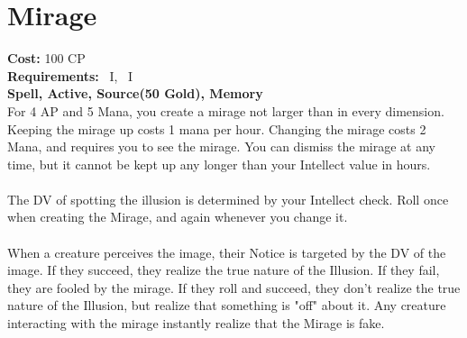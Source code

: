 \section{Mirage}\label{spell:mirage}
\textbf{Cost:} 100 CP\\
\textbf{Requirements:}~ I,~ I\\
\textbf{Spell, Active, Source(50 Gold), Memory}\\
For 4 AP and 5 Mana, you create a mirage not larger than  in every dimension.
Keeping the mirage up costs 1 mana per hour.
Changing the mirage costs 2 Mana, and requires you to see the mirage.
You can dismiss the mirage at any time, but it cannot be kept up any longer than your Intellect value in hours.\\
\\
The DV of spotting the illusion is determined by your Intellect check.
Roll once when creating the Mirage, and again whenever you change it. \\
\\
When a creature perceives the image, their Notice is targeted by the DV of the image.
If they succeed, they realize the true nature of the Illusion.
If they fail, they are fooled by the mirage.
If they roll and succeed, they don't realize the true nature of the Illusion, but realize that something is "off" about it.
Any creature interacting with the mirage instantly realize that the Mirage is fake.\\